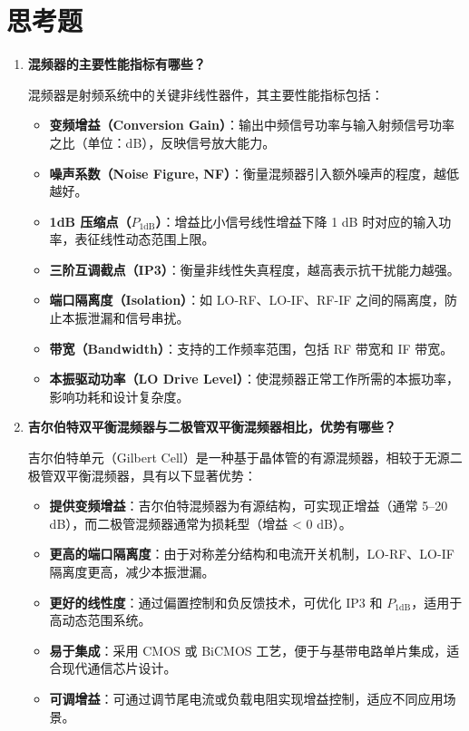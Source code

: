 \documentclass[12pt]{article}
\begin{document}
\section{思考题}
\begin{enumerate}[label=(\arabic*), leftmargin=*]

    \item \textbf{混频器的主要性能指标有哪些？}

    混频器是射频系统中的关键非线性器件，其主要性能指标包括：

    \begin{itemize}
        \item \textbf{变频增益（Conversion Gain）}：输出中频信号功率与输入射频信号功率之比（单位：dB），反映信号放大能力。
        \item \textbf{噪声系数（Noise Figure, NF）}：衡量混频器引入额外噪声的程度，越低越好。
        \item \textbf{1dB 压缩点（$P_{1\mathrm{dB}}$）}：增益比小信号线性增益下降 1 dB 时对应的输入功率，表征线性动态范围上限。
        \item \textbf{三阶互调截点（IP3）}：衡量非线性失真程度，越高表示抗干扰能力越强。
        \item \textbf{端口隔离度（Isolation）}：如 LO-RF、LO-IF、RF-IF 之间的隔离度，防止本振泄漏和信号串扰。
        \item \textbf{带宽（Bandwidth）}：支持的工作频率范围，包括 RF 带宽和 IF 带宽。
        \item \textbf{本振驱动功率（LO Drive Level）}：使混频器正常工作所需的本振功率，影响功耗和设计复杂度。
    \end{itemize}

    \item \textbf{吉尔伯特双平衡混频器与二极管双平衡混频器相比，优势有哪些？}

    吉尔伯特单元（Gilbert Cell）是一种基于晶体管的有源混频器，相较于无源二极管双平衡混频器，具有以下显著优势：

    \begin{itemize}
        \item \textbf{提供变频增益}：吉尔伯特混频器为有源结构，可实现正增益（通常 5–20 dB），而二极管混频器通常为损耗型（增益 < 0 dB）。
        \item \textbf{更高的端口隔离度}：由于对称差分结构和电流开关机制，LO-RF、LO-IF 隔离度更高，减少本振泄漏。
        \item \textbf{更好的线性度}：通过偏置控制和负反馈技术，可优化 IP3 和 $P_{1\mathrm{dB}}$，适用于高动态范围系统。
        \item \textbf{易于集成}：采用 CMOS 或 BiCMOS 工艺，便于与基带电路单片集成，适合现代通信芯片设计。
        \item \textbf{可调增益}：可通过调节尾电流或负载电阻实现增益控制，适应不同应用场景。
    \end{itemize}


\end{enumerate}
\end{document}
